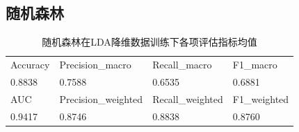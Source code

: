 \documentclass[10pt]{article}
\begin{document}
\subsection{随机森林}
\begin{table}[H]
  \centering
  \caption{随机森林在LDA降维数据训练下各项评估指标均值}
  \begin{tabular}{llll}
  \toprule
  Accuracy & Precision\_macro & Recall\_macro & F1\_macro \\
  0.8838 & 0.7588 & 0.6535 & 0.6881 \\
  \midrule
  AUC & Precision\_weighted & Recall\_weighted & F1\_weighted \\
  0.9417 & 0.8746 & 0.8838 & 0.8760 \\
  \bottomrule
  \end{tabular}
\end{table}
\end{document}
